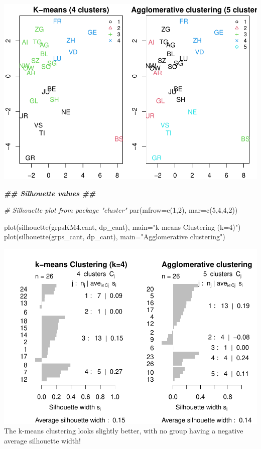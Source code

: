 \documentclass[
]{article}
\newenvironment{Shaded}{\begin{snugshade}}{\end{snugshade}}
\newcommand{\AttributeTok}[1]{\textcolor[rgb]{0.77,0.63,0.00}{#1}}
\newcommand{\CommentTok}[1]{\textcolor[rgb]{0.56,0.35,0.01}{\textit{#1}}}
\newcommand{\DecValTok}[1]{\textcolor[rgb]{0.00,0.00,0.81}{#1}}
\newcommand{\DocumentationTok}[1]{\textcolor[rgb]{0.56,0.35,0.01}{\textbf{\textit{#1}}}}
\newcommand{\FunctionTok}[1]{\textcolor[rgb]{0.00,0.00,0.00}{#1}}
\newcommand{\NormalTok}[1]{#1}
\newcommand{\StringTok}[1]{\textcolor[rgb]{0.31,0.60,0.02}{#1}}
\begin{document}
\includegraphics{Influence_factors_files/figure-latex/3.23_ca_comparison1_cant-1.pdf}

\begin{Shaded}
\begin{Highlighting}[]
\DocumentationTok{\#\# Silhouette values \#\#}

\CommentTok{\# Silhouette plot from package "cluster"}
\FunctionTok{par}\NormalTok{(}\AttributeTok{mfrow=}\FunctionTok{c}\NormalTok{(}\DecValTok{1}\NormalTok{,}\DecValTok{2}\NormalTok{), }\AttributeTok{mar=}\FunctionTok{c}\NormalTok{(}\DecValTok{5}\NormalTok{,}\DecValTok{4}\NormalTok{,}\DecValTok{4}\NormalTok{,}\DecValTok{2}\NormalTok{))}
 
\FunctionTok{plot}\NormalTok{(}\FunctionTok{silhouette}\NormalTok{(grpsKM4.cant, dp\_cant), }\AttributeTok{main=}\StringTok{"k{-}means Clustering (k=4)"}\NormalTok{)}
\FunctionTok{plot}\NormalTok{(}\FunctionTok{silhouette}\NormalTok{(grps\_cant, dp\_cant), }\AttributeTok{main=}\StringTok{"Agglomerative clustering"}\NormalTok{)}
\end{Highlighting}
\end{Shaded}

\includegraphics{Influence_factors_files/figure-latex/3.24_ca_comparison2_cant-1.pdf}
The k-means clustering looks slightly better, with no group having a
negative average silhouette width!
\end{document}
